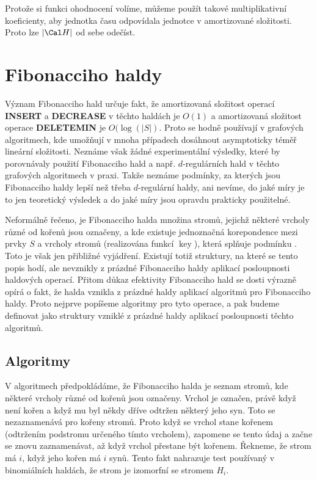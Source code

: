\documentclass[a4paper,12pt]{article}
\def \emph#1{\underbar{#1}}
\DeclareMathOperator*{\key}{key}
\begin{document}
Protože si funkci ohodnocení volíme, 
můžeme použít takové multiplikativní 
koeficienty, aby jednotka času odpovídala jednotce v 
amortizované složitosti. Proto lze $|\Cal H|$ od sebe odečíst.

\section{{Fibonacciho haldy}}

Význam Fibonacciho hald určuje fakt, že amortizovaná 
složitost operací {\bf INSERT} a {\bf DECREASE} v těchto haldách je 
$O(1)$ a amortizovaná složitost operace {\bf DELETEMIN} je $
O(\log(|S|)$. 
Proto se hodně používají v grafových algoritmech, 
kde umožňují v mnoha případech dosáhnout asymptoticky téměř lineární 
složitosti. Neznáme však žádné  
expe\-rimentální výsledky, které by porovnávaly použití Fibonacciho 
hald a např. $d$-regulárních hald v těchto grafových 
algoritmech v praxi. Takže neznáme podmínky, za 
kterých jsou Fibonacciho 
haldy lepší než třeba $d$-regulární haldy, 
ani nevíme, do jaké míry je to jen teoretický 
výsledek a do jaké míry jsou opravdu prakticky použitelné. 

Neformálně řečeno, je Fibonacciho halda množina 
stromů, jejichž některé vrcholy různé od 
kořenů jsou označeny, a kde existuje 
jednoznačná korepondence mezi prvky $S$ a vrcholy 
stromů (realizována funkcí $\key$), která splňuje 
podmínku .  Toto je však jen přibliž\-né 
vyjádření.  Existují totiž struktury, na které se tento 
popis hodí, ale 
nevznikly z prázd\-né Fibonacciho haldy aplikací 
posloupnosti haldových  
operací.  Přitom důkaz efekti\-vity Fibonacciho hald se 
dosti výrazně opírá o fakt, že halda vznikla z prázdné 
haldy aplikací algoritmů pro Fibonacciho 
haldy. Proto nejprve popíšeme algoritmy pro tyto 
ope\-race, a pak budeme
definovat \emph{Fibonacciho} \emph{haldy} jako struktury 
vzniklé z prázdné haldy aplikací posloupnosti 
těchto algoritmů.

\subsection{
Algoritmy
}

V algoritmech předpokládáme, že Fibonacciho halda je 
seznam stromů, kde některé vrcholy různé od 
kořenů jsou označeny.  Vrchol je označen, právě když není 
kořen a když mu byl někdy dříve odtržen některý jeho syn. Toto se 
nezaznamenává pro kořeny stromů. Proto když se 
vrchol stane kořenem (odtržením podstromu určeného 
tímto vrcholem),  
zapomene  se tento údaj a začne se znovu zaznamenávat, 
až když vrchol přestane 
být kořenem. \v Rekneme, že strom má \emph{rank} $i$, když 
jeho kořen 
má $i$ synů. Tento fakt nahrazuje test používaný 
v binomiálních 
haldách, že strom je izomorfní se stromem $H_i$. 
\end{document}
